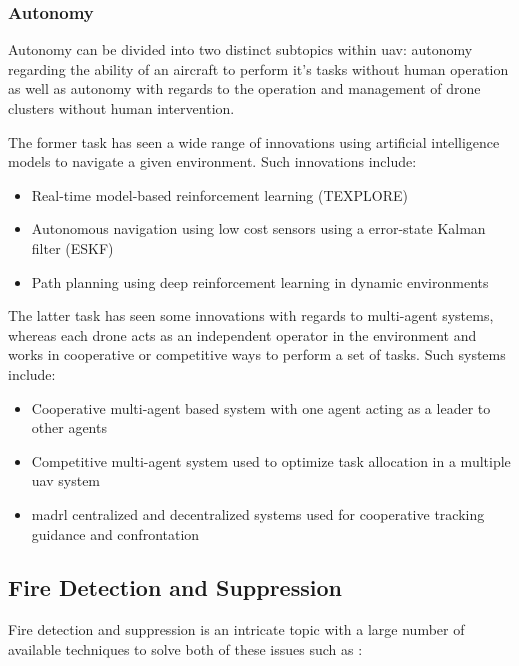 \documentclass[runningheads]{llncs}
\begin{document}
\subsubsection{Autonomy}

Autonomy can be divided into two distinct subtopics within \acrshort{uav}: autonomy regarding the ability of an aircraft to perform it's tasks without human operation as well as autonomy with regards to the operation and management of drone clusters without human intervention.

The former task has seen a wide range of innovations using artificial intelligence models to navigate a given environment. Such innovations include:

\begin{itemize}
	\item Real-time model-based reinforcement learning (TEXPLORE) \cite{7838739}
	\item Autonomous navigation using low cost sensors using a error-state Kalman filter (ESKF) \cite{Youn2021}
	\item Path planning using deep reinforcement learning in dynamic environments \cite{ZHANG2022108194}
\end{itemize}

The latter task has seen some innovations with regards to multi-agent systems, whereas each drone acts as an independent operator in the environment and works in cooperative or competitive ways to perform a set of tasks. Such systems include:

\begin{itemize}
	\item Cooperative multi-agent based system with one agent acting as a leader to other agents \cite{10.1007/978-3-030-49778-1_28}
	\item Competitive multi-agent system used to optimize task allocation in a multiple \acrshort{uav} system \cite{inproceedings4}
	\item \acrfull{madrl} centralized and decentralized systems used for cooperative tracking guidance and confrontation \cite{ZHOU2022100} \cite{article23}
\end{itemize}

\subsection{Fire Detection and Suppression}

Fire detection and suppression is an intricate topic with a large number of available techniques to solve both of these issues such as \cite{do8}:
\end{document}
